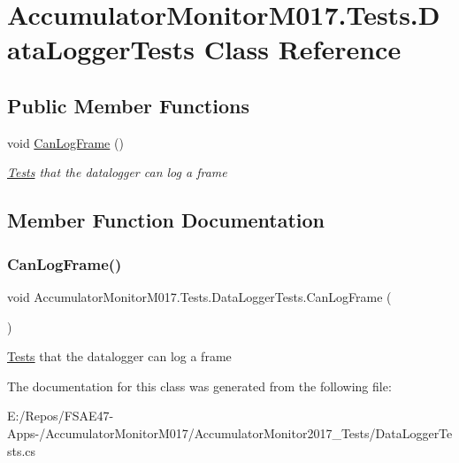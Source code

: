 \hypertarget{class_accumulator_monitor_m017_1_1_tests_1_1_data_logger_tests}{}\section{Accumulator\+Monitor\+M017.\+Tests.\+Data\+Logger\+Tests Class Reference}
\label{class_accumulator_monitor_m017_1_1_tests_1_1_data_logger_tests}
\subsection*{Public Member Functions}
\begin{DoxyCompactItemize}
\item 
void \hyperlink{class_accumulator_monitor_m017_1_1_tests_1_1_data_logger_tests_addea7538c5e7efa6afc825f821d221cc}{Can\+Log\+Frame} ()
\begin{DoxyCompactList}\small\item\em \hyperlink{namespace_accumulator_monitor_m017_1_1_tests}{Tests} that the datalogger can log a frame \end{DoxyCompactList}\end{DoxyCompactItemize}


\subsection{Member Function Documentation}
\mbox{\label{class_accumulator_monitor_m017_1_1_tests_1_1_data_logger_tests_addea7538c5e7efa6afc825f821d221cc}} 
\subsubsection{\texorpdfstring{Can\+Log\+Frame()}{CanLogFrame()}}
{\footnotesize\ttfamily void Accumulator\+Monitor\+M017.\+Tests.\+Data\+Logger\+Tests.\+Can\+Log\+Frame (\begin{DoxyParamCaption}{ }\end{DoxyParamCaption})\hspace{0.3cm}{\ttfamily [inline]}}



\hyperlink{namespace_accumulator_monitor_m017_1_1_tests}{Tests} that the datalogger can log a frame 



The documentation for this class was generated from the following file\+:\begin{DoxyCompactItemize}
\item 
E\+:/\+Repos/\+F\+S\+A\+E47-\/\+Apps-\//\+Accumulator\+Monitor\+M017/\+Accumulator\+Monitor2017\+\_\+\+Tests/Data\+Logger\+Tests.\+cs\end{DoxyCompactItemize}
